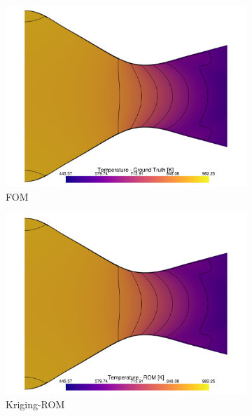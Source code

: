 \documentclass[tg, EN]{ufabcFHZh_tg}
\begin{document}
\begin{figure}[H]
    \centering
    \begin{subfigure}[b]{0.32\textwidth}
        \centering
        \includegraphics[width=\textwidth]{Figuras/kriging_ground_truth_temperature.pdf}
        \caption{FOM}
    \end{subfigure}
    \hfill
    \begin{subfigure}[b]{0.32\textwidth}
        \centering
        \includegraphics[width=\textwidth]{Figuras/kriging_prediction_temperature.pdf}
        \caption{Kriging-ROM}
    \end{subfigure}
    \hfill
    \begin{subfigure}[b]{0.32\textwidth}
        \centering

\end{subfigure}
\end{figure}
\end{document}
